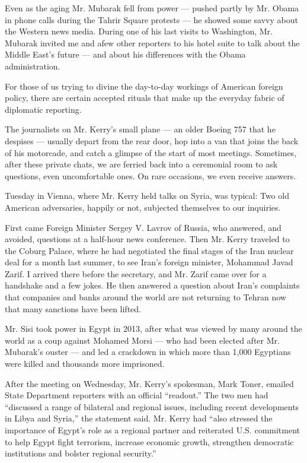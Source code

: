 Even as the aging Mr. Mubarak fell from power --- pushed partly by Mr.
Obama in phone calls during the Tahrir Square protests --- he showed
some savvy about the Western news media. During one of his last visits
to Washington, Mr. Mubarak invited me and afew other reporters to his
hotel suite to talk about the Middle East's future --- and about his
differences with the Obama administration.

For those of us trying to divine the day-to-day workings of American
foreign policy, there are certain accepted rituals that make up the
everyday fabric of diplomatic reporting.

The journalists on Mr. Kerry's small plane --- an older Boeing 757 that
he despises --- usually depart from the rear door, hop into a van that
joins the back of his motorcade, and catch a glimpse of the start of
most meetings. Sometimes, after these private chats, we are ferried back
into a ceremonial room to ask questions, even uncomfortable ones. On
rare occasions, we even receive answers.

Tuesday in Vienna, where Mr. Kerry held talks on Syria, was typical: Two
old American adversaries, happily or not, subjected themselves to our
inquiries.

First came Foreign Minister Sergey V. Lavrov of Russia, who answered,
and avoided, questions at a half-hour news conference. Then Mr. Kerry
traveled to the Coburg Palace, where he had negotiated the final stages
of the Iran nuclear deal for a month last summer, to see Iran's foreign
minister, Mohammad Javad Zarif. I arrived there before the secretary,
and Mr. Zarif came over for a handshake and a few jokes. He then
answered a question about Iran's complaints that companies and banks
around the world are not returning to Tehran now that many sanctions
have been lifted.

Mr. Sisi took power in Egypt in 2013, after what was viewed by many
around the world as a coup against Mohamed Morsi --- who had been
elected after Mr. Mubarak's ouster --- and led a crackdown in which more
than 1,000 Egyptians were killed and thousands more imprisoned.

After the meeting on Wednesday, Mr. Kerry's spokesman, Mark Toner,
emailed State Department reporters with an official ``readout.'' The two
men had ``discussed a range of bilateral and regional issues, including
recent developments in Libya and Syria,'' the statement said. Mr. Kerry
had ``also stressed the importance of Egypt's role as a regional partner
and reiterated U.S. commitment to help Egypt fight terrorism, increase
economic growth, strengthen democratic institutions and bolster regional
security.''

